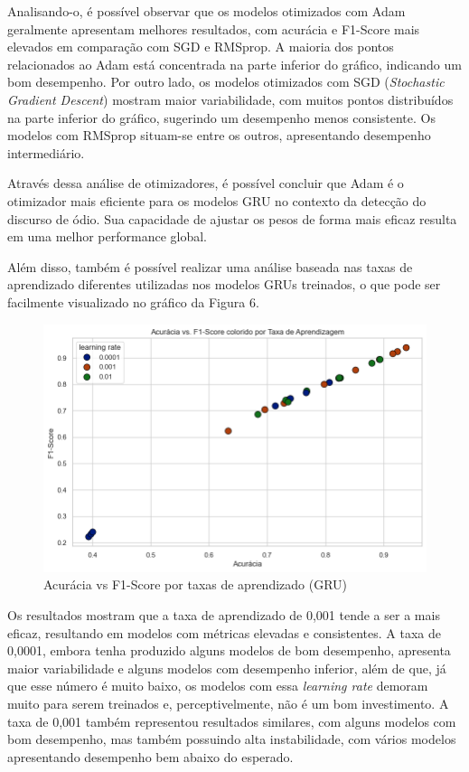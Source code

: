 \documentclass[conference]{IEEEtran}
\begin{document}
Analisando-o, é possível observar que os modelos otimizados com Adam geralmente apresentam melhores resultados, com acurácia e F1-Score mais elevados em comparação com SGD e RMSprop. A maioria dos pontos relacionados ao Adam está concentrada na parte inferior do gráfico, indicando um bom desempenho. Por outro lado, os modelos otimizados com SGD (\textit{Stochastic Gradient Descent}) mostram maior variabilidade, com muitos pontos distribuídos na parte inferior do gráfico, sugerindo um desempenho menos consistente. Os modelos com RMSprop situam-se entre os outros, apresentando desempenho intermediário.

Através dessa análise de otimizadores, é possível concluir que Adam é o otimizador mais eficiente para os modelos GRU no contexto da detecção do discurso de ódio. Sua capacidade de ajustar os pesos de forma mais eficaz resulta em uma melhor performance global.

Além disso, também é possível realizar uma análise baseada nas taxas de aprendizado diferentes utilizadas nos modelos GRUs treinados, o que pode ser facilmente visualizado no gráfico da Figura 6.

\begin{figure}[h!]
    \centering
    \includegraphics[width=\linewidth]{images/gru-lr.png}
    \caption{Acurácia vs F1-Score por taxas de aprendizado (GRU)}
    \label{fig:exemplo5}
\end{figure}

Os resultados mostram que a taxa de aprendizado de 0,001 tende a ser a mais eficaz, resultando em modelos com métricas elevadas e consistentes. A taxa de 0,0001, embora tenha produzido alguns modelos de bom desempenho, apresenta maior variabilidade e alguns modelos com desempenho inferior, além de que, já que esse número é muito baixo, os modelos com essa \textit{learning rate} demoram muito para serem treinados e, perceptivelmente, não é um bom investimento. A taxa de 0,001 também representou resultados similares, com alguns modelos com bom desempenho, mas também possuindo alta instabilidade, com vários modelos apresentando desempenho bem abaixo do esperado.
\end{document}
